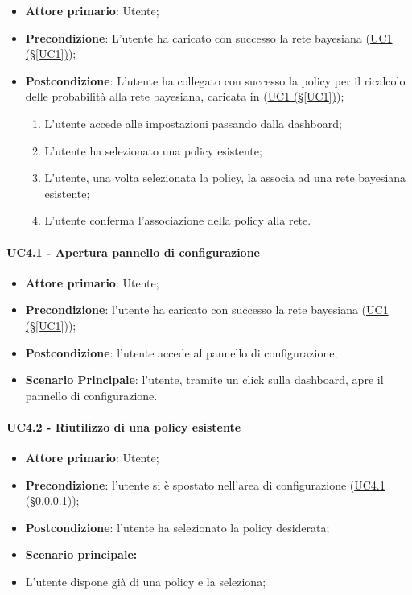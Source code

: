 \begin{itemize}
	\item \textbf{Attore primario}: Utente; 
	\item \textbf{Precondizione}: L'utente ha caricato con successo la rete bayesiana (\hyperref[UC1]{UC1 (§\ref*{UC1})});
	\item \textbf{Postcondizione}: L'utente ha collegato con successo la policy per il ricalcolo delle probabilità alla rete bayesiana, caricata in (\hyperref[UC1]{UC1 (§\ref*{UC1})});	
	
	\begin{enumerate}
		\item L'utente accede alle impostazioni passando dalla dashboard; 
		\item L'utente ha selezionato una policy esistente; 
		\item L'utente, una volta selezionata la policy, la associa ad una rete bayesiana esistente; 
		\item L'utente conferma l'associazione della policy alla rete. 	
	\end{enumerate}
	
\end{itemize}

\paragraph{UC4.1 - Apertura pannello di configurazione}\label{UC4.1}
\begin{itemize}
	\item \textbf{Attore primario}: Utente; 
	\item \textbf{Precondizione}: l'utente ha caricato con successo la rete bayesiana (\hyperref[UC1]{UC1 (§\ref*{UC1})});
	\item \textbf{Postcondizione}: l'utente accede al pannello di configurazione;
	\item \textbf{Scenario Principale}: l'utente, tramite un click sulla dashboard, apre il pannello di configurazione. 
\end{itemize}

\paragraph{UC4.2 - Riutilizzo di una policy esistente}\label{UC4.2}

\begin{itemize}
	\item \textbf{Attore primario}: Utente; 
	\item \textbf{Precondizione}: l'utente si è spostato nell'area di configurazione (\hyperref[UC4.1]{UC4.1 (§\ref*{UC4.1})});
	\item \textbf{Postcondizione}: l'utente ha selezionato la policy desiderata;
	\item \textbf{Scenario principale:}
	\item L'utente dispone già di una policy e la seleziona; 
\end{itemize}

